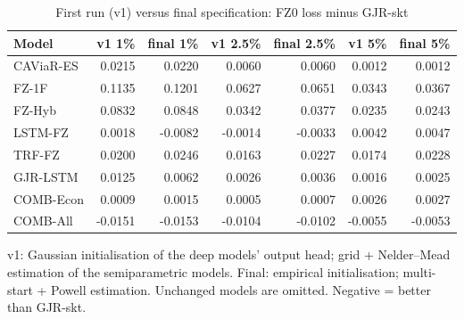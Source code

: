 \begin{table}[htbp]
\centering
\footnotesize
\caption{First run (v1) versus final specification: FZ0 loss minus GJR-skt}
\label{tab:revisions}
\begin{tabular}{lrrrrrr}
\toprule
Model & v1 1\% & final 1\% & v1 2.5\% & final 2.5\% & v1 5\% & final 5\% \\
\midrule
CAViaR-ES & 0.0215 & 0.0220 & 0.0060 & 0.0060 & 0.0012 & 0.0012 \\
FZ-1F & 0.1135 & 0.1201 & 0.0627 & 0.0651 & 0.0343 & 0.0367 \\
FZ-Hyb & 0.0832 & 0.0848 & 0.0342 & 0.0377 & 0.0235 & 0.0243 \\
LSTM-FZ & 0.0018 & -0.0082 & -0.0014 & -0.0033 & 0.0042 & 0.0047 \\
TRF-FZ & 0.0200 & 0.0246 & 0.0163 & 0.0227 & 0.0174 & 0.0228 \\
GJR-LSTM & 0.0125 & 0.0062 & 0.0026 & 0.0036 & 0.0016 & 0.0025 \\
COMB-Econ & 0.0009 & 0.0015 & 0.0005 & 0.0007 & 0.0026 & 0.0027 \\
COMB-All & -0.0151 & -0.0153 & -0.0104 & -0.0102 & -0.0055 & -0.0053 \\
\bottomrule
\end{tabular}
\par\smallskip\parbox{\linewidth}{\scriptsize v1: Gaussian initialisation of the deep models' output head; grid + Nelder--Mead estimation of the semiparametric models. Final: empirical initialisation; multi-start + Powell estimation. Unchanged models are omitted. Negative = better than GJR-skt.}
\end{table}
